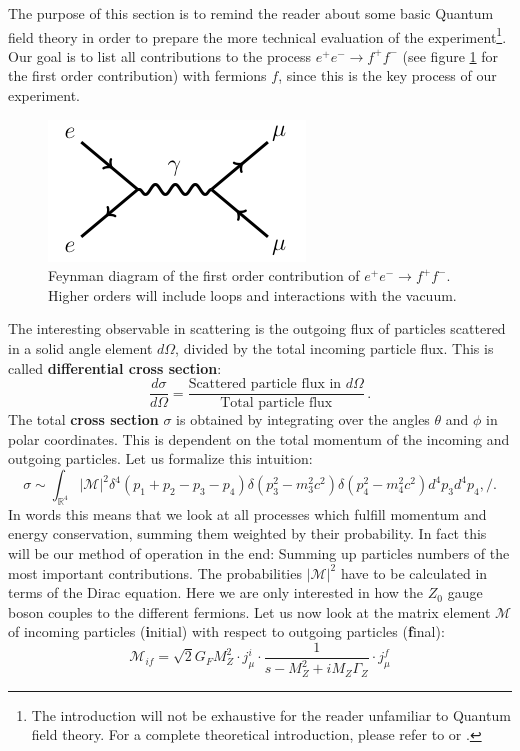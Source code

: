 The purpose of this section is to remind the reader about some basic Quantum field theory in order to prepare the 
more technical evaluation of the experiment\footnote{The introduction will not be exhaustive for the reader unfamiliar to
Quantum field theory. For a complete theoretical introduction, please refer to \cite{schroeder} or
\cite{weinberg1996quantum}.}. Our goal is to list all contributions to the process $e^{+}e^- \rightarrow f^+ f^-$ (see figure
\ref{fig:eemumu} for the first order contribution) with fermions $f$, since this is the key process of our experiment. 
\begin{figure}[htpb]
    \centering
    \includegraphics[width=0.6\linewidth]{figures/eemumu}
    \caption{Feynman diagram of the first order contribution of $e^{+}e^- \rightarrow f^+ f^-$. Higher orders will include
loops and interactions with the vacuum.}
    \label{fig:eemumu}
\end{figure}
The interesting observable in scattering is the outgoing flux of particles scattered in a solid angle element $d\Omega$, divided
by the total incoming particle flux. This is called \textbf{differential cross section}:
\begin{equation}
    \frac{d\sigma}{d\Omega} = \frac{\text{Scattered particle flux in }d\Omega }{\text{Total particle flux}}\,.
\end{equation}
The total \textbf{cross section} $\sigma$  is obtained
by integrating over the angles $\theta$ and $\phi$ in polar coordinates. This is dependent on the total momentum
of the incoming and outgoing particles. Let us formalize this intuition: 
\begin{equation}
    \sigma \sim \int_{\mathbb{R}^4} |\mathcal{M}|^2 \delta^4(p_1 + p_2 - p_3 - p_4) 
    \delta(p_3 ^2 - m_3^2 c^2) \delta(p_4 ^2 - m_4^2 c^2) d^4p_3 d^4p_4 ,/.
    \label{eq:sigma}
\end{equation}
In words this means that we look at all processes which fulfill momentum and energy conservation, summing them weighted by
their probability. In fact this will be our method of operation in the end: Summing up particles numbers of the most important
contributions. The probabilities $|\mathcal{M}|^2$  have to be calculated in terms of the Dirac equation.
Here we are only interested in how the $Z_0$ gauge boson couples to the different fermions. Let us now look at the matrix 
element $\mathcal{M}$ of incoming particles (\textbf{i}nitial)
with respect to outgoing particles (\textbf{f}inal):
\begin{equation}
    \mathcal{M}_{if} = \sqrt{2} G_F M_Z^2 \cdot j_\mu^{i} \cdot \frac{1}{s - M_Z^2 + iM_Z \Gamma_Z} \cdot j_\mu^{f}
    \label{eq:Mif}
\end{equation}

